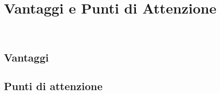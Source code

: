 
\pagestyle{IHA-fancy-style}
\chapter{Vantaggi e Punti di Attenzione}
\label{cap:vantaggi-e-punti-di-attenzione}

\\


\section{Vantaggi}
\label{vantaggi}

\section{Punti di attenzione}
\label{punti-di-attenzione}
